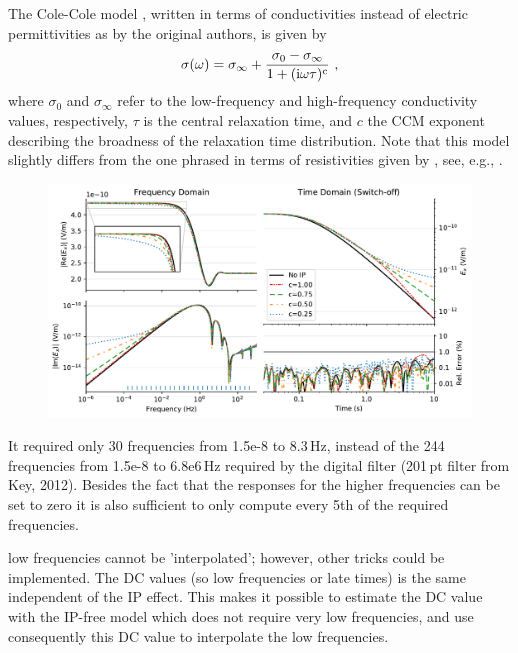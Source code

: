 \documentclass[extra, camera,%
    onecolumn,   %
    referee,     %
]{gji}
\newlength{\fwidth}
\begin{document}


The Cole-Cole model \citep[CCM, ][]{JCP.41.Cole}, written in terms of
conductivities instead of electric permittivities as by the original authors,
is given by
%
\begin{equation}
  \sigma(\omega) = \sigma_\infty + \frac{\sigma_0 - \sigma_\infty}{1 +
    (\rm{i}\omega\tau)^c}\ ,
  \label{eq:ccm}
\end{equation}
%
where $\sigma_0$ and $\sigma_\infty$ refer to the low-frequency and
high-frequency conductivity values, respectively, $\tau$ is the central
relaxation time, and $c$ the CCM exponent describing the broadness of the
relaxation time distribution. Note that this model slightly differs from the
one phrased in terms of resistivities given by \cite{GEO.78.Pelton}, see, e.g.,
\cite{GJI.13.Tarasov}.
%
\begin{figure}
  \centering
  \includegraphics[width=\fwidth]{11-cole-cole-model}
  \caption{}
  \label{fig:CCM}
\end{figure}
%

It required only 30 frequencies from 1.5e-8 to 8.3\,Hz, instead of the 244
frequencies from 1.5e-8 to 6.8e6\,Hz required by the digital filter (201\,pt
filter from Key, 2012). Besides the fact that the responses for the higher
frequencies can be set to zero it is also sufficient to only compute every
5th of the required frequencies.

low frequencies cannot be 'interpolated'; however, other tricks could be
implemented. The DC values (so low frequencies or late times) is the same
independent of the IP effect. This makes it possible to estimate the DC value
with the IP-free model which does not require very low frequencies, and use
consequently this DC value to interpolate the low frequencies.
\end{document}
